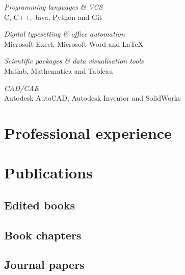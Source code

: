 \documentclass[11pt]{article}
\begin{document}
{\sl Programming languages \& VCS} \\ 
C, C++, Java, Python and Git

{\sl Digital typesetting \& office automation} \\ 
Microsoft Excel, Microsoft Word and \LaTeX

{\sl Scientific packages \& data visualisation tools}\\
Matlab, Mathematica and Tableau

{\sl CAD/CAE} \\ 
Autodesk AutoCAD, Autodesk Inventor and SolidWorks

\vspace{0.2in} %

\section*{Professional experience} 



\section*{Publications} 

\subsection*{Edited books}

\begin{enumerate}[label={[\arabic*]}]
	\item {}
\end{enumerate}

\subsection*{Book chapters}

\begin{enumerate}[label={[\arabic*]}]
	\item {}
	\item {}
\end{enumerate}

\subsection*{Journal papers}

\begin{enumerate}[label={[\arabic*]}]
	\item {}
\end{enumerate}



 
\end{document}
